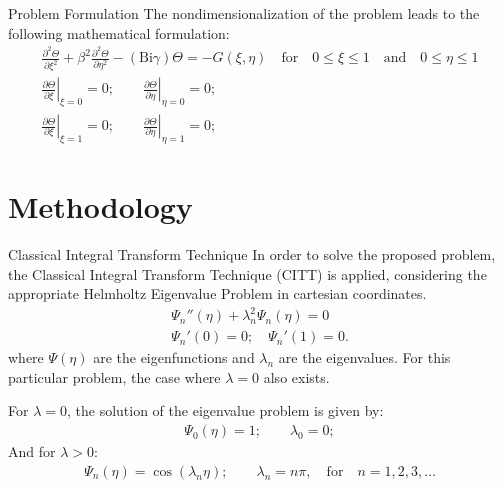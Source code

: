 \documentclass[english,landscape,xcolor=dvipsnames,aspectratio=169]{beamer}
\newcommand{\Bi}{\mathrm{Bi}}
\begin{document}
	
	
	
	
\begin{frame}{Problem Formulation}
The nondimensionalization of the problem leads to the following mathematical formulation:
%
\small
\begin{gather*}\label{equation}
\frac{\partial^2\Theta}{\partial \xi^2}+
\beta^2 \frac{\partial^2\Theta}{\partial \eta^2}-(\Bi \gamma) \Theta  =-G(\xi,\eta)  \quad \text{for} \quad 0\leq \xi \leq 1 \quad \text{and} \quad  0\leq \eta \leq 1
\\
\left.\frac{\partial\Theta}{\partial \xi}\right|_{\xi=0}=0;	\qquad		\left.\frac{\partial\Theta}{\partial \eta}\right|_{\eta=0}=0; \\ \left.\frac{\partial\Theta}{\partial \xi}\right|_{\xi=1}=0;	\qquad \left.\frac{\partial\Theta}{\partial \eta}\right|_{\eta=1}=0;
\end{gather*}
\end{frame}






	
\section{Methodology}






\begin{frame}{Classical Integral Transform Technique}
In order to solve the proposed problem, the Classical Integral Transform Technique (CITT) is applied, considering the appropriate Helmholtz Eigenvalue Problem in cartesian coordinates.
\begin{gather*}
\Psi_n''(\eta)+\lambda_n^2\Psi_n(\eta)=0 \\
\Psi_n'(0)=0; \quad \Psi_n'(1)=0.
\end{gather*}
where $\Psi(\eta)$ are the eigenfunctions and $\lambda_n$ are the eigenvalues. For this particular problem, the case where $\lambda=0$ also exists.

For $\lambda=0$, the solution of the eigenvalue problem is given by:
\begin{gather*}
\Psi_0(\eta)=1; \qquad \lambda_0=0;
\end{gather*} 
%
And for $\lambda>0$:
\begin{gather*}
\Psi_n(\eta)=\cos(\lambda_n \eta); \qquad \lambda_n=n \pi, \quad \text{for} \quad n=1,2,3,\dots
\end{gather*} 
\end{frame}
\end{document}
